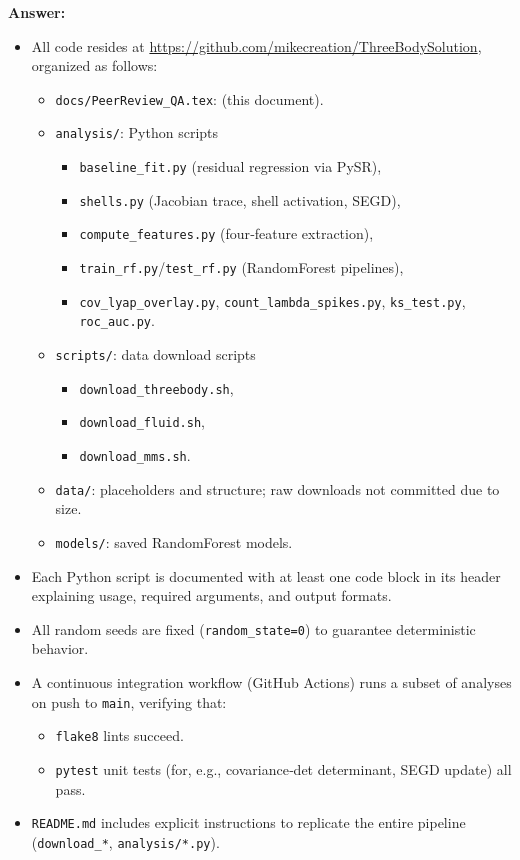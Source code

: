 \documentclass[11pt]{article}
\begin{document}
\noindent\textbf{Answer:}  
\begin{itemize}[itemsep=0.5em]
  \item All code resides at \url{https://github.com/mikecreation/ThreeBodySolution}, organized as follows:
    \begin{itemize}[itemsep=0.25em]
      \item \texttt{docs/PeerReview\_QA.tex}: (this document).  
      \item \texttt{analysis/}: Python scripts  
        \begin{itemize}[itemsep=0.25em]
          \item \texttt{baseline\_fit.py} (residual regression via PySR),  
          \item \texttt{shells.py} (Jacobian trace, shell activation, SEGD),  
          \item \texttt{compute\_features.py} (four‐feature extraction),  
          \item \texttt{train\_rf.py}/\texttt{test\_rf.py} (RandomForest pipelines),  
          \item \texttt{cov\_lyap\_overlay.py}, \texttt{count\_lambda\_spikes.py}, \texttt{ks\_test.py}, \texttt{roc\_auc.py}.  
        \end{itemize}
      \item \texttt{scripts/}: data download scripts  
        \begin{itemize}[itemsep=0.25em]
          \item \texttt{download\_threebody.sh},  
          \item \texttt{download\_fluid.sh},  
          \item \texttt{download\_mms.sh}.  
        \end{itemize}
      \item \texttt{data/}: placeholders and structure; raw downloads not committed due to size.  
      \item \texttt{models/}: saved RandomForest models.  
    \end{itemize}
  \item Each Python script is documented with at least one code block in its header explaining usage, required arguments, and output formats.  
  \item All random seeds are fixed (\texttt{random\_state=0}) to guarantee deterministic behavior.  
  \item A continuous integration workflow (GitHub Actions) runs a subset of analyses on push to \texttt{main}, verifying that:
    \begin{itemize}[itemsep=0.25em]
      \item \texttt{flake8} lints succeed.  
      \item \texttt{pytest} unit tests (for, e.g., covariance‐det determinant, SEGD update) all pass.  
    \end{itemize}
  \item \texttt{README.md} includes explicit instructions to replicate the entire pipeline (\texttt{download\_*}, \texttt{analysis/*.py}).  
\end{itemize}
\end{document}
